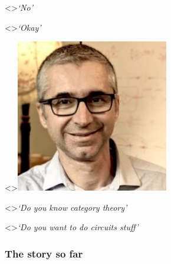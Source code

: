 \begin{frame}
\begin{minipage}{0.49\textwidth}
        \visible<\iftoggle{static}{1}{5-}>{\emph{`No'}}

        \visible<\iftoggle{static}{1}{7-}>{\emph{`Okay'}}
    \end{minipage}
    \begin{minipage}{0.49\textwidth}
        \centering
        \visible<\iftoggle{static}{1}{3-}>{\includegraphics[width=0.5\textwidth]{imgs/ghica}}

        \visible<\iftoggle{static}{1}{4-}>{\emph{`Do you know category theory'}}

        \visible<\iftoggle{static}{1}{6-}>{\emph{`Do you want to do circuits stuff'}}
    \end{minipage}
\end{frame}

\begin{frame}
    \frametitle{The story so far}

    \centering


\end{frame}

